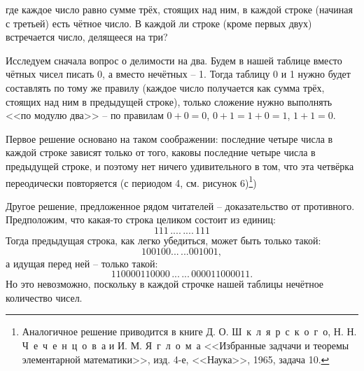 где каждое число равно сумме трёх, стоящих над ним, в каждой строке (начиная с третьей) есть чётное число. В каждой ли строке (кроме первых двух) встречается число, делящееся на три?\par Исследуем сначала вопрос о делимости на два. Будем в нашей таблице вместо чётных чисел писать 0, а вместо нечётных -- 1. Тогда таблицу 0 и 1 нужно будет составлять по тому же правилу (каждое число получается как сумма трёх, стоящих над ним в предыдущей строке), только сложение нужно выполнять <<по модулю два>> -- по правилам $0+0=0$, $0+1 = 1+0 =1$, $1+1 = 0$. \par Первое решение основано на таком соображении: последние четыре числа в каждой строке зависят только от того, каковы последние четыре числа в предыдущей строке, и поэтому нет ничего удивительного в том, что эта четвёрка переодически повторяется (с периодом 4, см. рисунок 6)\footnote{Аналогичное решение приводится в книге Д. О. Ш~к~л~я~р~с~к~о~г~о, Н. Н. Ч~е~ч~е~н~ц~о~в~а и И. М. Я~г~л~о~м~а <<Избранные задчачи и теоремы элементарной математики>>, изд. 4-е, <<Наука>>, 1965, задача 10.})
\par Другое решение, предложенное рядом читателей -- доказательство от противного. Предположим, что какая-то строка целиком состоит из единиц: $$111{\,....\,....\,}111$$
Тогда предыдущая строка, как легко убедиться, может быть только такой:
$$100100{...\,...}001001{,}$$
а идущая перед ней -- только такой:
$$110000110000{\,...\,...\,}000011000011{.}$$
Но это невозможно, поскольку в каждой строчке нашей таблицы нечётное количество чисел.